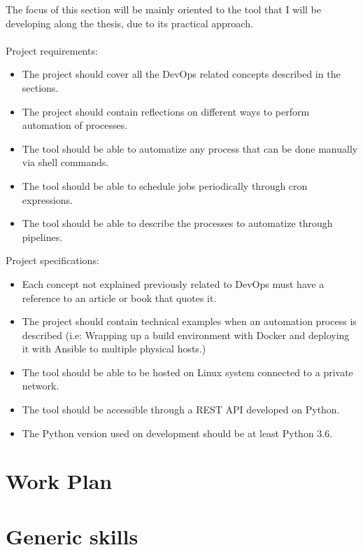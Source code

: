 \documentclass[a4paper]{article}
\begin{document}
The focus of this section will be mainly oriented to the tool that I will be developing along the thesis, due to its practical approach.
\\~\\
Project requirements:
\begin{itemize}
	\item The project should cover all the DevOps related concepts described in the sections.
	\item The project should contain reflections on different ways to perform automation of processes.
	\item The tool should be able to automatize any process that can be done manually via shell commands.
	\item The tool should be able to schedule jobs periodically through cron expressions.
	\item The tool should be able to describe the processes to automatize through pipelines.
\end{itemize}
Project specifications:
\begin{itemize}
	\item Each concept not explained previously related to DevOps must have a reference to an article or book that quotes it.
	\item The project should contain technical examples when an automation process is described (i.e: Wrapping up a build environment with Docker and deploying it with Ansible to multiple physical hosts.)
	\item The tool should be able to be hosted on Linux system connected to a private network.
	\item The tool should be accessible through a REST API developed on Python.
	\item The Python version used on development should be at least Python 3.6.
	
\end{itemize}
\section{Work Plan}

\section{Generic skills}
\end{document}
